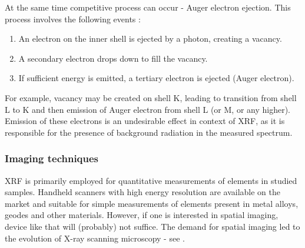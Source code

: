 At the same time competitive process can occur - Auger electron ejection. This process involves the following events \cite{augerElectron}:
\begin{enumerate}
    \item An electron on the inner shell is ejected by a photon, creating a vacancy.
    \item A secondary electron drops down to fill the vacancy.
    \item If sufficient energy is emitted, a tertiary electron is ejected (Auger electron).
\end{enumerate}
For example, vacancy may be created on shell K, leading to transition from shell L to K and then emission of Auger electron from shell L (or M, or any higher).
Emission of these electrons is an undesirable effect in context of XRF, as it is responsible for the presence of background radiation in the measured spectrum.

\subsubsection{Imaging techniques}
XRF is primarily employed for quantitative measurements of elements in studied samples. 
Handheld scanners with high energy resolution are available on the market and suitable for simple measurements of elements present in metal alloys, geodes and other materials. 
However, if one is interested in spatial imaging, device like that will (probably) not suffice. 
The demand for spatial imaging led to the evolution of X-ray scanning microscopy - see .

